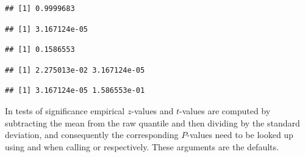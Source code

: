 \documentclass[krantz2]{krantz}\usepackage{knitr}%
\begin{document}
\begin{knitrout}\footnotesize
{}\color{fgcolor}\begin{kframe}
\begin{alltt}
\hlstd{(} \hlstd{=} \hlstd{,}  \hlstd{=} \hlstd{,}  \hlstd{=} \hlstd{)}
\end{alltt}
\begin{verbatim}
## [1] 0.9999683
\end{verbatim}
\begin{alltt}
\hlstd{(} \hlstd{=} \hlstd{,}  \hlstd{=} \hlstd{,}  \hlstd{=} \hlstd{,}  \hlstd{=} \hlstd{)}
\end{alltt}
\begin{verbatim}
## [1] 3.167124e-05
\end{verbatim}
\begin{alltt}
\hlstd{(} \hlstd{=} \hlstd{,}  \hlstd{=} \hlstd{,}  \hlstd{=} \hlstd{,}  \hlstd{=} \hlstd{)}
\end{alltt}
\begin{verbatim}
## [1] 0.1586553
\end{verbatim}
\begin{alltt}
\hlstd{(} \hlstd{=} \hlstd{(}\hlstd{,} \hlstd{),}  \hlstd{=} \hlstd{,}  \hlstd{=} \hlstd{,}  \hlstd{=} \hlstd{)}
\end{alltt}
\begin{verbatim}
## [1] 2.275013e-02 3.167124e-05
\end{verbatim}
\begin{alltt}
\hlstd{(} \hlstd{=} \hlstd{,}  \hlstd{=} \hlstd{,}  \hlstd{=} \hlstd{(}\hlstd{,} \hlstd{),}  \hlstd{=} \hlstd{)}
\end{alltt}
\begin{verbatim}
## [1] 3.167124e-05 1.586553e-01
\end{verbatim}
\end{kframe}
\end{knitrout}

\begin{explainbox}
  In tests of significance empirical $z$-values and $t$-values are computed by subtracting the mean from the raw quantile and then dividing by the standard deviation, and consequently the corresponding $P$-values need to be looked up using  and  when calling  or  respectively. These arguments are the defaults.
\end{explainbox}
\end{document}
